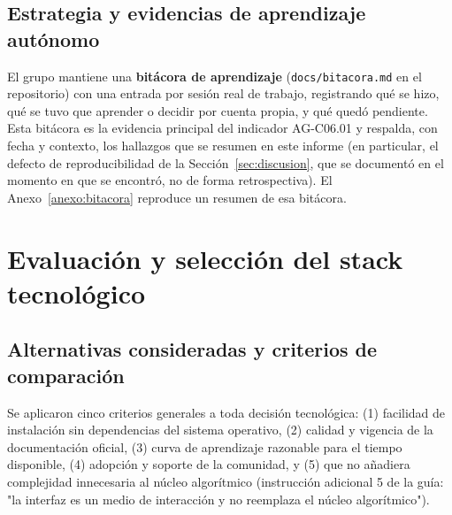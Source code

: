 \documentclass[11pt,a4paper]{article}
\begin{document}
\subsection{Estrategia y evidencias de aprendizaje autónomo}
El grupo mantiene una \textbf{bitácora de aprendizaje} (\texttt{docs/bitacora.md} en el
repositorio) con una entrada por sesión real de trabajo, registrando qué se hizo, qué se
tuvo que aprender o decidir por cuenta propia, y qué quedó pendiente. Esta bitácora es la
evidencia principal del indicador AG-C06.01 y respalda, con fecha y contexto, los hallazgos
que se resumen en este informe (en particular, el defecto de reproducibilidad de la
Sección~\ref{sec:discusion}, que se documentó en el momento en que se encontró, no de forma
retrospectiva). El Anexo~\ref{anexo:bitacora} reproduce un resumen de esa bitácora.

\section{Evaluación y selección del stack tecnológico}
\label{sec:stack}

\subsection{Alternativas consideradas y criterios de comparación}
Se aplicaron cinco criterios generales a toda decisión tecnológica: (1) facilidad de
instalación sin dependencias del sistema operativo, (2) calidad y vigencia de la
documentación oficial, (3) curva de aprendizaje razonable para el tiempo disponible,
(4) adopción y soporte de la comunidad, y (5) que no añadiera complejidad innecesaria al
núcleo algorítmico (instrucción adicional 5 de la guía: "la interfaz es un medio de
interacción y no reemplaza el núcleo algorítmico").
\end{document}
